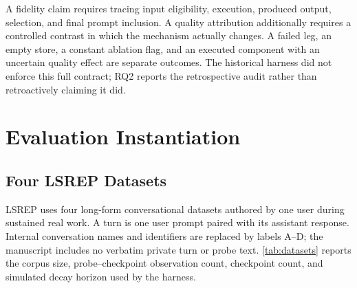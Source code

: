 \documentclass[11pt,a4paper]{article}
\begin{document}
A fidelity claim requires tracing input eligibility, execution, produced output, selection, and final prompt inclusion. A quality attribution additionally requires a controlled contrast in which the mechanism actually changes. A failed leg, an empty store, a constant ablation flag, and an executed component with an uncertain quality effect are separate outcomes. The historical harness did not enforce this full contract; RQ2 reports the retrospective audit rather than retroactively claiming it did.

\section{Evaluation Instantiation}
\subsection{Four LSREP Datasets}
\label{sec:datasets}

LSREP uses four long-form conversational datasets authored by one user during sustained real work. A turn is one user prompt paired with its assistant response. Internal conversation names and identifiers are replaced by labels A--D; the manuscript includes no verbatim private turn or probe text. \cref{tab:datasets} reports the corpus size, probe--checkpoint observation count, checkpoint count, and simulated decay horizon used by the harness.

\begin{table}[htbp]
\centering
\small
\caption{ICE v2 LSREP datasets and evaluation coverage. Observations repeat 219 distinct probes (A: 45; B: 91; C: 37; D: 46). Token counts use the harness's documented estimate, $1.33\times$ whitespace-delimited words, rather than a model-specific tokenizer. ``Days'' is the maximum simulated decay horizon, not elapsed wall-clock time.}
\label{tab:datasets}
\end{table}
\end{document}
